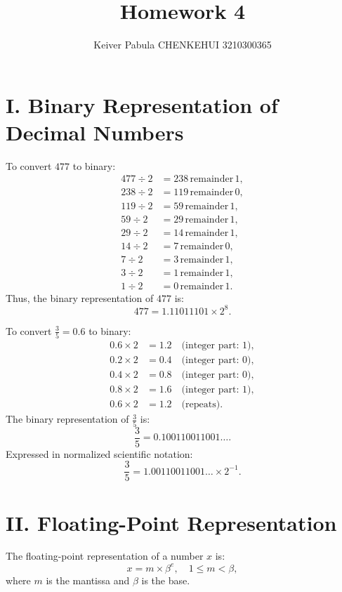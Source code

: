 \documentclass{article}
\title{Homework 4}
\author{Keiver Pabula CHENKEHUI 3210300365}
\begin{document}
\maketitle


\section{I. Binary Representation of Decimal Numbers}

To convert \( 477 \) to binary:
\[
\begin{aligned}
477 \div 2 &= 238 \, \text{remainder} \, 1, \\
238 \div 2 &= 119 \, \text{remainder} \, 0, \\
119 \div 2 &= 59 \, \text{remainder} \, 1, \\
59 \div 2 &= 29 \, \text{remainder} \, 1, \\
29 \div 2 &= 14 \, \text{remainder} \, 1, \\
14 \div 2 &= 7 \, \text{remainder} \, 0, \\
7 \div 2 &= 3 \, \text{remainder} \, 1, \\
3 \div 2 &= 1 \, \text{remainder} \, 1, \\
1 \div 2 &= 0 \, \text{remainder} \, 1.
\end{aligned}
\]
Thus, the binary representation of \( 477 \) is:
\[
477 = 1.11011101 \times 2^8.
\]

To convert \( \frac{3}{5} = 0.6 \) to binary:
\[
\begin{aligned}
0.6 \times 2 &= 1.2 \quad \text{(integer part: 1)}, \\
0.2 \times 2 &= 0.4 \quad \text{(integer part: 0)}, \\
0.4 \times 2 &= 0.8 \quad \text{(integer part: 0)}, \\
0.8 \times 2 &= 1.6 \quad \text{(integer part: 1)}, \\
0.6 \times 2 &= 1.2 \quad \text{(repeats)}.
\end{aligned}
\]
The binary representation of \( \frac{3}{5} \) is:
\[
\frac{3}{5} = 0.100110011001\ldots.
\]
Expressed in normalized scientific notation:
\[
\frac{3}{5} = 1.00110011001\ldots \times 2^{-1}.
\]

\section{II. Floating-Point Representation}

The floating-point representation of a number \( x \) is:
\[
x = m \times \beta^e, \quad 1 \leq m < \beta,
\]
where \( m \) is the mantissa and \( \beta \) is the base.
\end{document}

